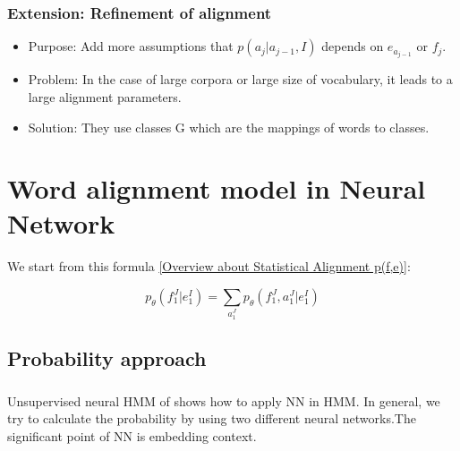 \documentclass{article}
\begin{document}
\subsubsection{Extension: Refinement of alignment}

\begin{itemize}
\item Purpose: Add more assumptions that $p(a_j | a_{j-1}, I)$ depends on $e_{a_{j -1}}$ or $f_j$.
\item Problem: In the case of large corpora or large size of vocabulary, it leads to a large alignment parameters.
\item Solution: They use classes G which are the mappings of words to classes.
\end{itemize}

\section{Word alignment model in Neural Network}
We start from this formula \eqref{Overview about Statistical Alignment p(f,e)}:

\begin{equation}
p_{\theta}(f_1^J|e_1^I) = \sum_{a_1^J} p_{\theta}(f_1^J, a_1^J|e_1^I)
\label{Word Alignment Model Neural Network p(f,e)}
\end{equation}

\subsection{Probability approach}
\subsubsection{\cite{Tran16unsupervised}}
Unsupervised neural HMM of \cite{Tran16unsupervised} shows how to apply NN in HMM. In general, we try to calculate the probability by using two different neural networks.The significant point of NN is embedding context.
\end{document}
